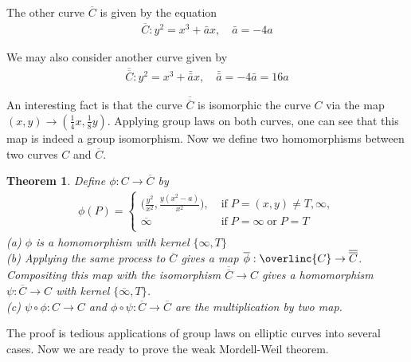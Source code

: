 \documentclass[11pt]{article}
\newcommand{\<}{\langle}
\renewcommand{\>}{\rangle}
\numberwithin{equation}{section}
\theoremstyle{plain}
\newtheorem{thm}{Theorem}[section]
\theoremstyle{definition}
\begin{document}
    The other curve \( \overline{C} \) is given by the equation
        \begin{align*}
            \overline{C}: y^2 = x^3 + \bar{a}x, \quad \bar{a} = -4a
        \end{align*}
    
    We may also consider another curve given by
        \begin{align*}
            \overline{\overline{C}}: y^2 = x^3 + \bar{\bar{a}}x, \quad \bar{\bar{a}} = -4 \bar{a} = 16a
        \end{align*}
    
    An interesting fact is that the curve \(\overline{\overline{C}}\) is isomorphic the curve \(C\) via the map \( (x,y) \rightarrow ( \frac{1}{4}x, \frac{1}{8}y ) \). Applying group laws on both curves, one can see that this map is indeed a group isomorphism. Now we define two homomorphisms between two curves \(C\) and \(\overline{C}\). 
    \begin{thm}Define \(\phi: C \rightarrow \overline{C}\) by 
        \begin{align*}
         \phi(P) = 
            \begin{cases}
                \displaystyle \Big( \frac{y^2}{x^2}, \frac{y(x^2-a)}{x^2} \Big),  \; & \text{if} \; P = (x,y) \ne T, \infty, \\
                \overline{\infty} \; & \text{if} \; P=\infty \; \text{or} \; P=T \\ 
                \end{cases}
        \end{align*}
    (a) \(\phi\) is a homomorphism with kernel \( \{ \infty, T\} \) \\
    (b) Applying the same process to \(\overline{C}\) gives a map \(\overline{\phi} : \overlinc{C} \rightarrow \overline{\overline{C}}\). Compositing this map with the isomorphism \(\overline{\overline{C}} \rightarrow C\) gives a homomorphism \(\psi: \overline{C} \rightarrow C \) with kernel \(\{\overline{\infty}, T\}\). \\
    (c) \( \psi \circ \phi: C \rightarrow C \) and \( \phi \circ \psi: \overline{C} \rightarrow \overline{C} \) are the multiplication by two map.
    \end{thm}
    The proof is tedious applications of group laws on elliptic curves into several cases. Now we are ready to prove the weak Mordell-Weil theorem.
\end{document}
